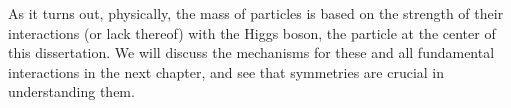 As it turns out, physically, the mass of particles is based on the strength of their interactions (or lack thereof) with the Higgs boson, the particle at the center of this dissertation.
We will discuss the mechanisms for these and all fundamental interactions in the next chapter, and see that symmetries are crucial in understanding them.




